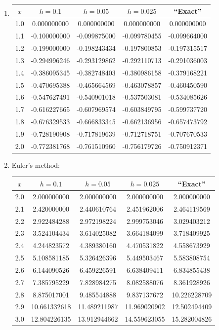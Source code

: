 \documentclass[openany]{book}
\newenvironment{sectionSolutions}{
 \begin{enumerate}[item-label={\thesection.\arabic{enumi}.}]
}{
 \end{enumerate}
}
\begin{document}
\begin{sectionSolutions}
\item
{\small
{}
\begin{tabular}{S[table-format=1.1] *4{S[table-format=-1.9]}  }\toprule
{$x$}&{$h=0.1$}&{$h=0.05$}&{$h=0.025$}&{``Exact''}\\  &  0.000000000 &  0.000000000 &  0.000000000 &  0.000000000 \\
1.1 & -0.100000000 & -0.099875000 & -0.099780455 & -0.099664000 \\
1.2 & -0.199000000 & -0.198243434 & -0.197800853 & -0.197315517 \\
1.3 & -0.294996246 & -0.293129862 & -0.292110713 & -0.291036003 \\
1.4 & -0.386095345 & -0.382748403 & -0.380986158 & -0.379168221 \\
1.5 & -0.470695388 & -0.465664569 & -0.463078857 & -0.460450590 \\
1.6 & -0.547627491 & -0.540901018 & -0.537503081 & -0.534085626 \\
1.7 & -0.616227665 & -0.607969574 & -0.603849795 & -0.599737720 \\
1.8 & -0.676329533 & -0.666833345 & -0.662136956 & -0.657473792 \\
1.9 & -0.728190908 & -0.717819639 & -0.712718751 & -0.707670533 \\
2.0 & -0.772381768 & -0.761510960 & -0.756179726 & -0.750912371 \\
\bottomrule
\end{tabular}}\bigskip



\item
{\small Euler's method:
\begin{tabular}{S[table-format=1.1] *4{S[table-format=2.9]}  }\toprule
{$x$}&{$h=0.1$}&{$h=0.05$}&{$h=0.025$}&{``Exact''}\\  &  2.000000000 &  2.000000000 &  2.000000000 &  2.000000000 \\
2.1 &  2.420000000 &  2.440610764 &  2.451962006 &  2.464119569 \\
2.2 &  2.922484288 &  2.972198224 &  2.999753046 &  3.029403212 \\
2.3 &  3.524104434 &  3.614025082 &  3.664184099 &  3.718409925 \\
2.4 &  4.244823572 &  4.389380160 &  4.470531822 &  4.558673929 \\
2.5 &  5.108581185 &  5.326426396 &  5.449503467 &  5.583808754 \\
2.6 &  6.144090526 &  6.459226591 &  6.638409411 &  6.834855438 \\
2.7 &  7.385795229 & 7.828984275  & 8.082588076  & 8.361928926 \\
2.8 &  8.875017001 & 9.485544888  & 9.837137672  & 10.226228709 \\
2.9 & 10.661332618 & 11.489211987 & 11.969020902 & 12.502494409 \\
3.0 &12.804226135 & 13.912944662 & 14.559623055 & 15.282004826 \\
\bottomrule
\end{tabular}}\bigskip


\end{sectionSolutions}
\end{document}
